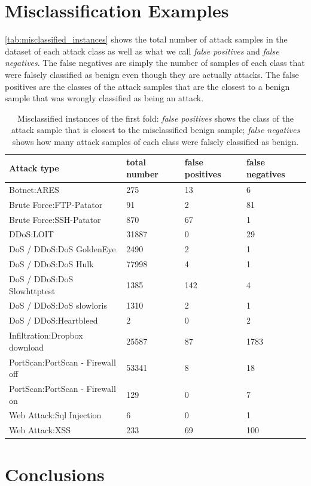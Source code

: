 \documentclass[10pt,sigconf,letterpaper]{acmart}
\begin{document}
\section{Misclassification Examples}
\autoref{tab:misclassified_instances} shows the total number of attack samples in the dataset of each attack class as well as what we call \textit{false positives} and \textit{false negatives}. The false negatives are simply the number of samples of each class that were falsely classified as benign even though they are actually attacks. 
The false positives are the classes of the attack samples that are the closest to a benign sample that was wrongly classified as being an attack. 

\begin{table}
\caption{Misclassified instances of the first fold: \textit{false positives} shows the class of the attack sample that is closest to the misclassified benign sample; \textit{false negatives} shows how many attack samples of each class were falsely classified as benign.}
\label{tab:misclassified_instances}
\begin{tabular}{l l l l} 
\toprule 
Attack type & total number & false positives & false negatives \\
\midrule
Botnet:ARES  & 275 & 13 & 6 \\
Brute Force:FTP-Patator & 91 & 2 & 81 \\
Brute Force:SSH-Patator & 870 & 67 & 1 \\
DDoS:LOIT & 31887 & 0 & 29 \\
DoS / DDoS:DoS GoldenEye & 2490 & 2 & 1 \\
DoS / DDoS:DoS Hulk & 77998 & 4 & 1 \\
DoS / DDoS:DoS Slowhttptest & 1385 & 142 & 4 \\
DoS / DDoS:DoS slowloris & 1310 & 2 & 1 \\
DoS / DDoS:Heartbleed & 2 & 0 & 2 \\
Infiltration:Dropbox download & 25587 & 87 & 1783 \\
PortScan:PortScan - Firewall off & 53341 & 8 & 18 \\
PortScan:PortScan - Firewall on & 129 & 0 & 7 \\
Web Attack:Sql Injection & 6 & 0 & 1 \\
Web Attack:XSS & 233 & 69 & 100 \\
\bottomrule
\end{tabular}
\end{table}


\section{Conclusions}
\end{document}
